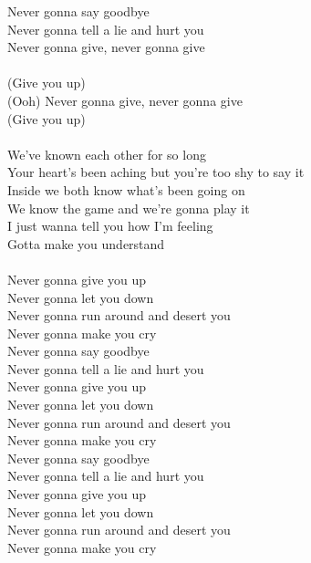 \documentclass{42-en}
\begin{document}
    Never gonna say goodbye\\
    Never gonna tell a lie and hurt you\\
    Never gonna give, never gonna give\\
    \\
    (Give you up)\\
    (Ooh) Never gonna give, never gonna give\\
    (Give you up)\\
    \\
    We've known each other for so long\\
    Your heart's been aching but you're too shy to say it\\
    Inside we both know what's been going on\\
    We know the game and we're gonna play it\\
    I just wanna tell you how I'm feeling\\
    Gotta make you understand\\
    \\
    Never gonna give you up\\
    Never gonna let you down\\
    Never gonna run around and desert you\\
    Never gonna make you cry\\
    Never gonna say goodbye\\
    Never gonna tell a lie and hurt you\\
    Never gonna give you up\\
    Never gonna let you down\\
    Never gonna run around and desert you\\
    Never gonna make you cry\\
    Never gonna say goodbye\\
    Never gonna tell a lie and hurt you\\
    Never gonna give you up\\
    Never gonna let you down\\
    Never gonna run around and desert you\\
    Never gonna make you cry

\end{document}
